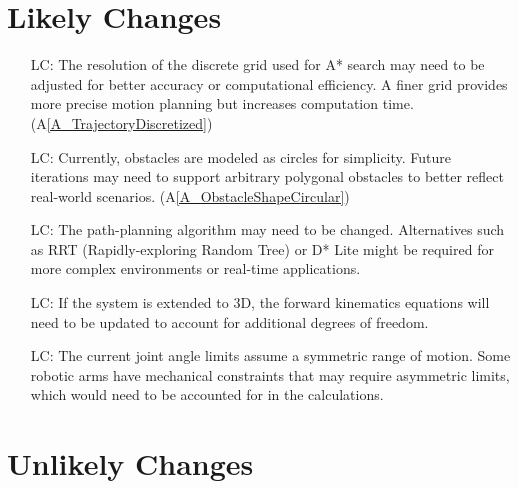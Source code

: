 \documentclass[12pt]{article}
\newcommand{\aref}[1]{A\ref{#1}}
\newcounter{lcnum} %
\begin{document}
  \section{Likely Changes}    

  \noindent \begin{itemize}
  
  \item[LC\refstepcounter{lcnum}\thelcnum\label{LC_GridResolution}:]  
  The resolution of the discrete grid used for A* search may need to be adjusted for better accuracy or computational efficiency. A finer grid provides more precise motion planning but increases computation time. (\aref{A_TrajectoryDiscretized})
  
  \item[LC\refstepcounter{lcnum}\thelcnum\label{LC_ObstacleShapes}:]  
  Currently, obstacles are modeled as circles for simplicity. Future iterations may need to support arbitrary polygonal obstacles to better reflect real-world scenarios. (\aref{A_ObstacleShapeCircular})
  
  \item[LC\refstepcounter{lcnum}\thelcnum\label{LC_PathPlanningAlgorithm}:]  
  The path-planning algorithm may need to be changed. Alternatives such as RRT (Rapidly-exploring Random Tree) or D* Lite might be required for more complex environments or real-time applications. 
  
  \item[LC\refstepcounter{lcnum}\thelcnum\label{LC_Kinematics}:]  
  If the system is extended to 3D, the forward kinematics equations will need to be updated to account for additional degrees of freedom. 
  
  \item[LC\refstepcounter{lcnum}\thelcnum\label{LC_JointLimits}:]  
  The current joint angle limits assume a symmetric range of motion. Some robotic arms have mechanical constraints that may require asymmetric limits, which would need to be accounted for in the calculations.
  
  \end{itemize}

  \section{Unlikely Changes}    
\end{document}
